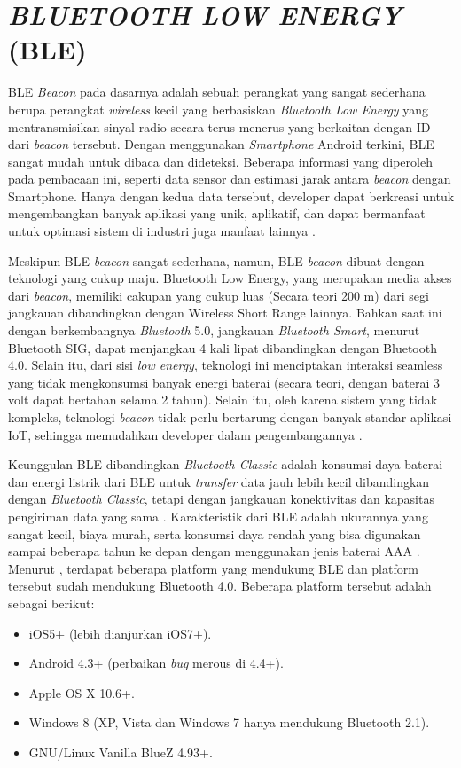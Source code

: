 \section{\uppercase{\textit{BLUETOOTH LOW ENERGY} (BLE)}}
\par BLE \textit{Beacon} pada dasarnya adalah sebuah perangkat yang sangat sederhana berupa perangkat \textit{wireless} kecil yang berbasiskan \textit{Bluetooth Low Energy} yang mentransmisikan sinyal radio secara terus menerus yang berkaitan dengan ID dari \textit{beacon} tersebut. Dengan menggunakan \textit{Smartphone} Android terkini, BLE sangat mudah untuk dibaca dan dideteksi. Beberapa informasi yang diperoleh pada pembacaan ini, seperti data sensor dan estimasi jarak antara \textit{beacon} dengan Smartphone. Hanya dengan kedua data tersebut, developer dapat berkreasi untuk mengembangkan banyak aplikasi yang unik, aplikatif, dan dapat bermanfaat untuk optimasi sistem di industri juga manfaat lainnya \citep{Wan2019}.

\par Meskipun BLE \textit{beacon} sangat sederhana, namun, BLE \textit{beacon} dibuat dengan teknologi yang cukup maju. Bluetooth Low Energy, yang merupakan media akses dari \textit{beacon}, memiliki cakupan yang cukup luas (Secara teori 200 m) dari segi jangkauan dibandingkan dengan Wireless Short Range lainnya. Bahkan saat ini dengan berkembangnya \textit{Bluetooth} 5.0, jangkauan \textit{Bluetooth Smart}, menurut Bluetooth SIG, dapat menjangkau 4 kali lipat dibandingkan dengan Bluetooth 4.0. Selain itu, dari sisi \textit{low energy}, teknologi ini menciptakan interaksi seamless yang tidak mengkonsumsi banyak energi baterai (secara teori, dengan baterai 3 volt dapat bertahan selama 2 tahun). Selain itu, oleh karena sistem yang tidak kompleks, teknologi \textit{beacon} tidak perlu bertarung dengan banyak standar aplikasi IoT, sehingga memudahkan developer dalam pengembangannya \citep{Lashkari2018}.

\par Keunggulan BLE dibandingkan \textit{Bluetooth Classic} adalah konsumsi daya baterai dan energi listrik dari BLE untuk \textit{transfer} data jauh lebih kecil dibandingkan dengan \textit{Bluetooth Classic}, tetapi dengan jangkauan konektivitas dan kapasitas pengiriman data yang sama \citep{bluetoothsig2010}. Karakteristik dari BLE adalah ukurannya yang sangat kecil, biaya murah, serta konsumsi daya rendah yang bisa digunakan sampai beberapa tahun ke depan dengan menggunakan jenis baterai AAA \citep{Keluza2017}. Menurut \cite{Paganini2015}, terdapat beberapa platform yang mendukung BLE dan platform tersebut sudah mendukung Bluetooth 4.0. Beberapa platform tersebut adalah sebagai berikut:
\begin {itemize}
\itemsep0em
\item iOS5+ (lebih dianjurkan iOS7+).
\item Android 4.3+ (perbaikan \textit{bug} merous di 4.4+).
\item Apple OS X 10.6+.
\item Windows 8 (XP, Vista dan Windows 7 hanya mendukung Bluetooth 2.1).
\item GNU/Linux Vanilla BlueZ 4.93+.
\end{itemize}

